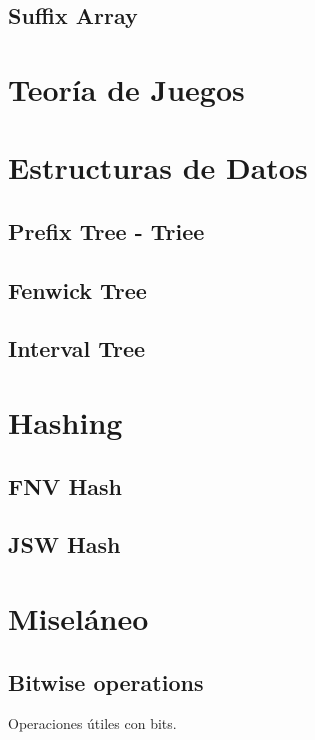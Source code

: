 \documentclass[10pt,letterpaper,twocolumn,twosided]{article}
\newcommand{\codigofuente}[1]{

\dotfill
}
\begin{document}
\subsection{Suffix Array}

\section{Teoría de Juegos}

\section{Estructuras de Datos}

\subsection{Prefix Tree - Triee}

\subsection{Fenwick Tree}

\subsection{Interval Tree}

\section{Hashing} %

\subsection{FNV Hash}

\subsection{JSW Hash}

\section{Miseláneo}

\subsection {Bitwise operations}
Operaciones útiles con bits.

\codigofuente{../src/bitwise.${EXT}}
\end{document}
